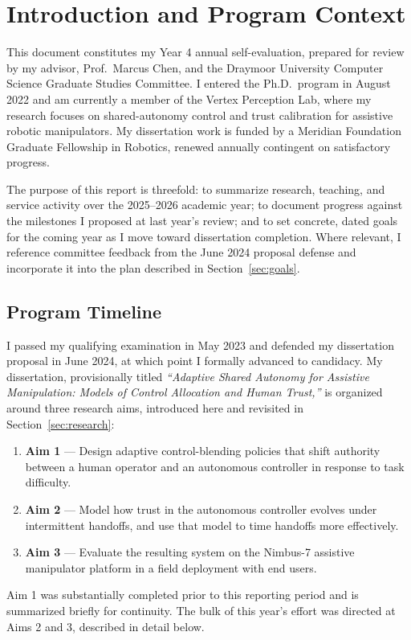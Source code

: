 \section{Introduction and Program Context}

This document constitutes my Year 4 annual self-evaluation, prepared for review by my advisor,
Prof.\ Marcus Chen, and the Draymoor University Computer Science Graduate Studies Committee. I
entered the Ph.D.\ program in August 2022 and am currently a member of the Vertex Perception
Lab, where my research focuses on shared-autonomy control and trust calibration for assistive
robotic manipulators. My dissertation work is funded by a Meridian Foundation Graduate
Fellowship in Robotics, renewed annually contingent on satisfactory progress.

The purpose of this report is threefold: to summarize research, teaching, and service activity
over the 2025--2026 academic year; to document progress against the milestones I proposed at
last year's review; and to set concrete, dated goals for the coming year as I move toward
dissertation completion. Where relevant, I reference committee feedback from the June 2024
proposal defense and incorporate it into the plan described in Section~\ref{sec:goals}.

\subsection*{Program Timeline}

I passed my qualifying examination in May 2023 and defended my dissertation proposal in June
2024, at which point I formally advanced to candidacy. My dissertation, provisionally titled
\emph{``Adaptive Shared Autonomy for Assistive Manipulation: Models of Control Allocation and
Human Trust,''} is organized around three research aims, introduced here and revisited in
Section~\ref{sec:research}:

\begin{enumerate}
  \item \textbf{Aim 1} --- Design adaptive control-blending policies that shift authority
    between a human operator and an autonomous controller in response to task difficulty.
  \item \textbf{Aim 2} --- Model how trust in the autonomous controller evolves under
    intermittent handoffs, and use that model to time handoffs more effectively.
  \item \textbf{Aim 3} --- Evaluate the resulting system on the Nimbus-7 assistive manipulator
    platform in a field deployment with end users.
\end{enumerate}

Aim 1 was substantially completed prior to this reporting period and is summarized briefly for
continuity. The bulk of this year's effort was directed at Aims 2 and 3, described in detail
below.
